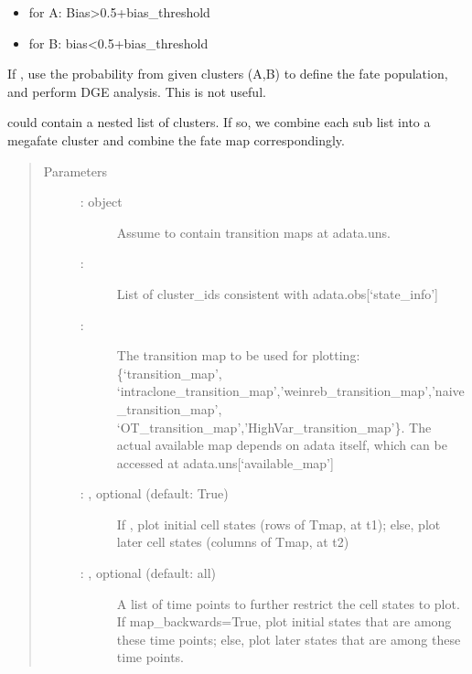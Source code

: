 \documentclass[letterpaper,10pt,english]{sphinxmanual}
\begin{document}
\begin{fulllineitems}
\begin{itemize}
\item {} 
for A: Bias\textgreater{}0.5+bias\_threshold

\item {} 
for B: bias\textless{}0.5+bias\_threshold

\end{itemize}

If , use the probability from given clusters (A,B)
to define the fate population, and perform DGE analysis. This is not useful.

 could contain a nested list of clusters. If so, we
combine each sub list into a mega\sphinxhyphen{}fate cluster and combine the fate
map correspondingly.
\begin{quote}\begin{description}
\item[{Parameters}] \leavevmode\begin{description}
\item[{ :  object}] \leavevmode
Assume to contain transition maps at adata.uns.

\item[{ : }] \leavevmode
List of cluster\_ids consistent with adata.obs{[}‘state\_info’{]}

\item[{ : }] \leavevmode
The transition map to be used for plotting: \{‘transition\_map’,
‘intraclone\_transition\_map’,’weinreb\_transition\_map’,’naive\_transition\_map’,
‘OT\_transition\_map’,’HighVar\_transition\_map’\}. The actual available
map depends on adata itself, which can be accessed at adata.uns{[}‘available\_map’{]}

\item[{ : , optional (default: True)}] \leavevmode
If , plot initial cell states (rows of Tmap, at t1);
else, plot later cell states (columns of Tmap, at t2)

\item[{ : , optional (default: all)}] \leavevmode
A list of time points to further restrict the cell states to plot.
If map\_backwards=True, plot initial states that are among these time points;
else, plot later states that are among these time points.


\end{description}
\end{description}
\end{quote}
\end{fulllineitems}
\end{document}
